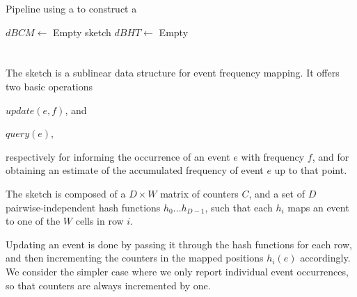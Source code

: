 \begin{algorithm}
  \caption{Pipeline using a \dBCM to construct a \dBHT}\label{alg:pipeline}
  $\mathit{dBCM} \gets$ Empty \dBCM sketch\;
  $\mathit{dBHT} \gets$ Empty \dBHT\;
\end{algorithm}

\section{\cm}
\label{sec:countmin}

The \cm sketch \cite{Cormode2005} is a sublinear data structure for event frequency mapping.
It offers two basic operations
\begin{compactenum}
\item $update(e, f)$, and
\item $query(e)$,
\end{compactenum}
respectively for informing the occurrence of an event $e$ with frequency $f$, and for obtaining an estimate of the accumulated frequency of event $e$ up to that point.

The sketch is composed of a $D\times W$ matrix of counters $C$, and a set of $D$ pairwise-independent hash functions $h_0\ldots h_{D-1}$, such that each $h_i$ maps an event to one of the $W$ cells in row $i$.


Updating an event is done by passing it through the hash functions for each row, and then incrementing the counters in
the mapped positions $h_i(e)$ accordingly. 
We consider the simpler case where we only report individual event occurrences, so that counters are always incremented by one.

